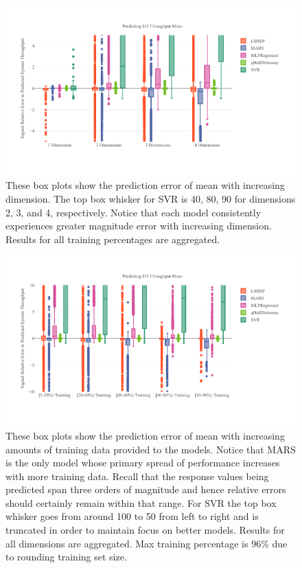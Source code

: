 \documentclass{scspaperproc}
\theoremstyle{scsthe}
\begin{document}
\begin{figure}
  \centering
  \includegraphics[width=\textwidth,trim={0 .5in 0 .3in}]{Mean_Dim.pdf}
  \caption{These box plots show the prediction error of mean with
    increasing dimension. The top box whisker for SVR is 40, 80, 90
    for dimensions 2, 3, and 4, respectively. Notice that each model
    consistently experiences greater magnitude error with increasing
    dimension. Results for all training percentages are aggregated.}
  \label{fig:mean_dim}
\end{figure}

\begin{figure}
  \centering
  \includegraphics[width=\textwidth,trim={0 .5in 0 .3in}]{Mean_TT_Ratio.pdf}
  \caption{These box plots show the prediction error of mean with
    increasing amounts of training data provided to the models. Notice
    that MARS is the only model whose primary spread of performance
    increases with more training data. Recall that the response values
    being predicted span three orders of magnitude and hence relative
    errors should certainly remain within that range. For SVR the top
    box whisker goes from around 100 to 50 from left to right and is
    truncated in order to maintain focus on better models. Results for
    all dimensions are aggregated. Max training percentage is 96\% due
    to rounding training set size.}
  \label{fig:mean_tt_ratio}
\end{figure}
\end{document}
